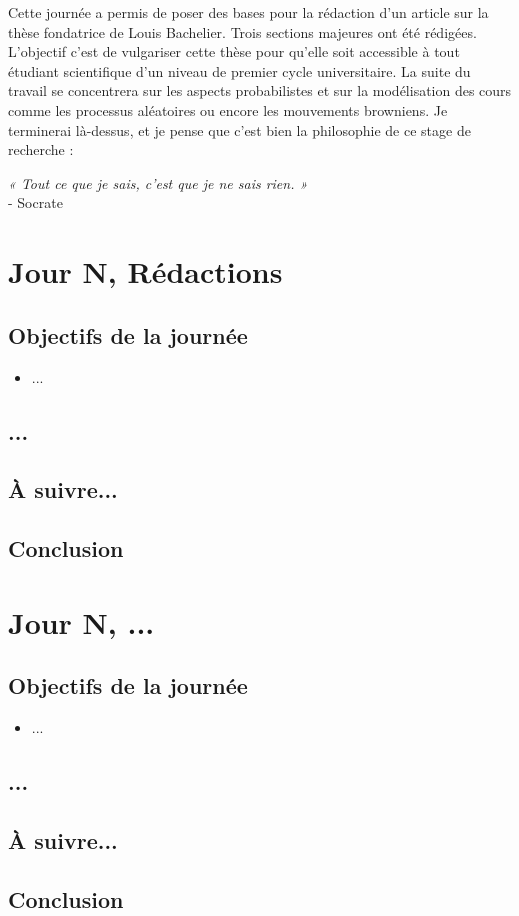 \documentclass[a4paper,11pt]{article}
\begin{document}
Cette journée a permis de poser des bases pour la rédaction d’un article sur la thèse fondatrice de Louis Bachelier. Trois sections majeures ont été rédigées. L’objectif c'est de vulgariser cette thèse pour qu'elle soit accessible à tout étudiant scientifique d'un niveau de premier cycle universitaire. La suite du travail se concentrera sur les aspects probabilistes et sur la modélisation des cours comme les processus aléatoires ou encore les mouvements browniens. Je terminerai là-dessus, et je pense que c'est bien la philosophie de ce stage de recherche :
\begin{center}
    \large{\textit{« Tout ce que je sais, c’est que je ne sais rien. »}\\- Socrate}
\end{center}

\newpage


\section{Jour N, Rédactions}
\subsection{Objectifs de la journée}
\begin{itemize}
    \item ...
\end{itemize}
\subsection{...}
\subsection{À suivre...}
\subsection{Conclusion}
\newpage


\section{Jour N, ...}
\subsection{Objectifs de la journée}
\begin{itemize}
    \item ...
\end{itemize}
\subsection{...}
\subsection{À suivre...}
\subsection{Conclusion}
\newpage


\end{document}
